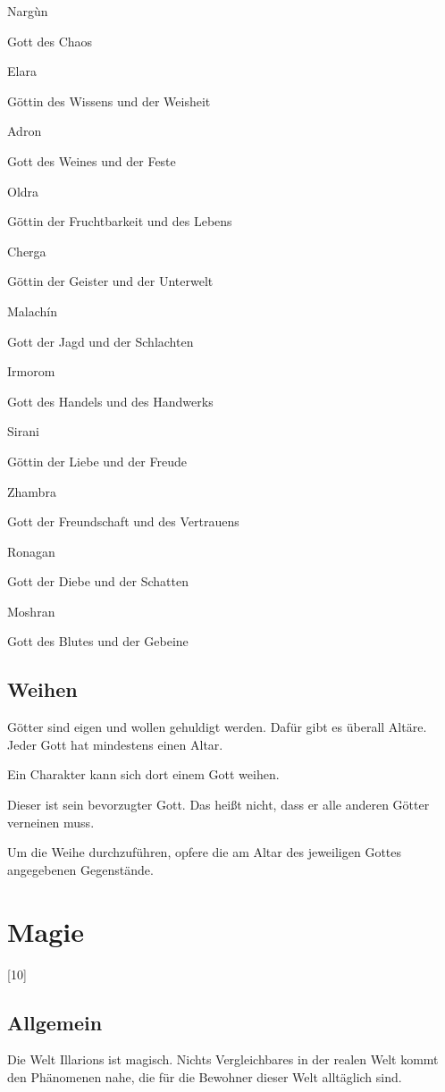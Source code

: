 \documentclass[a4paper,11pt]{book}
\begin{document}
Nargùn

Gott des Chaos

Elara

Göttin des Wissens und der Weisheit

Adron

Gott des Weines und der Feste

Oldra

Göttin der Fruchtbarkeit und des Lebens

Cherga

Göttin der Geister und der Unterwelt

Malachín

Gott der Jagd und der Schlachten

Irmorom

Gott des Handels und des Handwerks

Sirani

Göttin der Liebe und der Freude

Zhambra

Gott der Freundschaft und des Vertrauens

Ronagan

Gott der Diebe und der Schatten

Moshran

Gott des Blutes und der Gebeine

\subsection{Weihen}

Götter sind eigen und wollen gehuldigt werden. Dafür gibt es überall Altäre. Jeder Gott hat mindestens einen Altar.

Ein Charakter kann sich dort einem Gott weihen.

Dieser ist sein bevorzugter Gott. Das heißt nicht, dass er alle anderen Götter verneinen muss.

Um die Weihe durchzuführen, opfere die am Altar des jeweiligen Gottes angegebenen Gegenstände.

\section{Magie}

[10]

\subsection{Allgemein}

Die Welt Illarions ist magisch. Nichts Vergleichbares in der realen Welt kommt den Phänomenen nahe, die für die Bewohner dieser Welt alltäglich sind.
\end{document}
